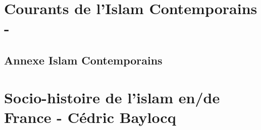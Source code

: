 \documentclass[oneside,10pt]{book} %
\begin{document}
\part{Courants de l'Islam Contemporains - }


%















 


%



\chapter{Annexe Islam Contemporains}
%
%


\part{Socio-histoire de l’islam en/de France - Cédric Baylocq}











% 
% 
% 
\end{document}
